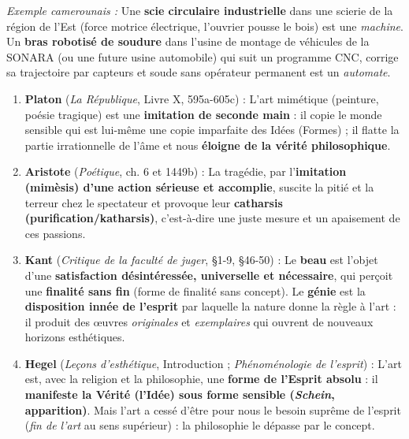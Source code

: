 \documentclass[11pt]{article}
\begin{document}
\begin{corrige}
\begin{enumerate}
\emph{Exemple camerounais :} Une \textbf{scie circulaire industrielle} dans une scierie de la région de l'Est (force motrice électrique, l'ouvrier pousse le bois) est une \emph{machine}. Un \textbf{bras robotisé de soudure} dans l'usine de montage de véhicules de la SONARA (ou une future usine automobile) qui suit un programme CNC, corrige sa trajectoire par capteurs et soude sans opérateur permanent est un \emph{automate}.
\end{enumerate}
\end{corrige}

\begin{corrige}
\begin{enumerate}
\item \textbf{Platon} (\emph{La République}, Livre X, 595a-605c) : \guillemotleft L'art mimétique (peinture, poésie tragique) est une \textbf{imitation de seconde main} : il copie le monde sensible qui est lui-même une copie imparfaite des Idées (Formes) ; il flatte la partie irrationnelle de l'âme et nous \textbf{éloigne de la vérité philosophique}. \guillemotright
\item \textbf{Aristote} (\emph{Poétique}, ch. 6 et 1449b) : \guillemotleft La tragédie, par l'\textbf{imitation (mimèsis) d'une action sérieuse et accomplie}, suscite la pitié et la terreur chez le spectateur et provoque leur \textbf{catharsis (purification/katharsis)}, c'est-à-dire une juste mesure et un apaisement de ces passions. \guillemotright
\item \textbf{Kant} (\emph{Critique de la faculté de juger}, §1-9, §46-50) : \guillemotleft Le \textbf{beau} est l'objet d'une \textbf{satisfaction désintéressée, universelle et nécessaire}, qui perçoit une \textbf{finalité sans fin} (forme de finalité sans concept). Le \textbf{génie} est la \textbf{disposition innée de l'esprit} par laquelle la nature donne la règle à l'art : il produit des œuvres \emph{originales} et \emph{exemplaires} qui ouvrent de nouveaux horizons esthétiques. \guillemotright
\item \textbf{Hegel} (\emph{Leçons d'esthétique}, Introduction ; \emph{Phénoménologie de l'esprit}) : \guillemotleft L'art est, avec la religion et la philosophie, une \textbf{forme de l'Esprit absolu} : il \textbf{manifeste la Vérité (l'Idée) sous forme sensible (\emph{Schein}, apparition)}. Mais l'art \guillemotleft a cessé d'être pour nous le besoin suprême de l'esprit \guillemotright (\emph{fin de l'art} au sens supérieur) : la philosophie le dépasse par le concept. \guillemotright

\end{enumerate}
\end{corrige}
\end{document}
